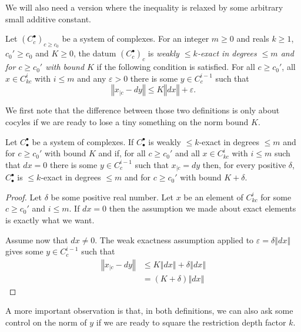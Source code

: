 We will also need a version where the inequality is relaxed by some arbitrary small additive constant.

\begin{definition}
  \label{is_weak_bounded_exact}
  \leanok
  Let $(C_c^\bullet)_{c\geq c_0}$ be a system of complexes.
  For an integer $m\geq 0$ and reals $k \ge 1$, $c_0'\geq c_0$ and $K\geq0$,
  the datum $(C_c^\bullet)_c$ is
  \emph{weakly $\leq k$-exact in degrees $\leq m$ and for $c\geq c_0'$ with bound $K$} if the following condition is satisfied.
  For all $c\geq c_0'$, all $x\in C_{kc}^i$ with $i\leq m$ and any $ε > 0$
  there is some $y\in C_c^{i-1}$ such that
  \[
    ‖x_{|c} - dy‖ ≤ K ‖dx‖ + ε.
  \]
\end{definition}

We first note that the difference between those two definitions is only about
cocyles if we are ready to lose a tiny something on the norm bound $K$.



\begin{lemma}
  \label{is_bounded_exact_of_weakly}
  Let $C_\bullet^\bullet$ be a system of complexes. If $C_\bullet^\bullet$ is
  weakly $\leq k$-exact in degrees $\leq m$ and for $c\geq c_0'$ with bound $K$ and if,
  for all $c\geq c_0'$ and all $x\in C_{kc}^i$ with $i\leq m$ such that $dx = 0$
  there is some $y\in C_c^{i-1}$  such that
  $x_{|c} = dy$ then, for every positive $δ$,
  $C_\bullet^\bullet$ is $\leq k$-exact in degrees $\leq m$ and for $c\geq c_0'$ with
  bound $K + δ$.
\end{lemma}

\begin{proof}
  \leanok
  Let $δ$ be some positive real number.
  Let $x$ be an element of $C_{kc}^i$ for some $c ≥ c_0'$ and $i ≤ m$. If $dx = 0$
  then the assumption we made about exact elements is exactly what we want.

  Assume now that $dx ≠ 0$. The weak exactness assumption applied to $ε = δ‖dx‖$
  gives some $y\in C_c^{i-1}$ such that
  \begin{align*}
    ‖x_{|c} - dy‖ &≤ K‖dx‖ + δ‖dx‖ \\
                  &= (K + δ)‖dx‖
  \end{align*}
\end{proof}

A more important observation is that, in both definitions, we can also ask some
control on the norm of $y$ if we are ready to square the restriction depth factor $k$.

